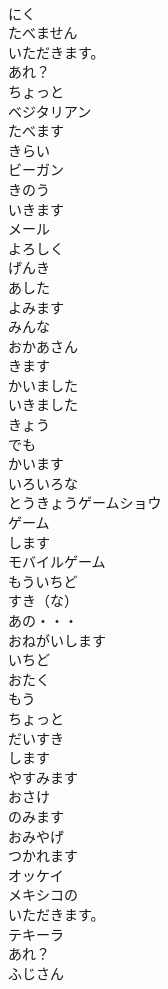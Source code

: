 \documentclass[8pt]{extreport}
\begin{document}
\begin{CJK}{UTF8}{min}
\\	にく
\\	たべません
\\	いただきます。
\\	あれ？
\\	ちょっと
\\	ベジタリアン
\\	たべます
\\	きらい
\\	ビーガン
\\	きのう
\\	いきます
\\	メール
\\	よろしく
\\	げんき
\\	あした
\\	よみます
\\	みんな
\\	おかあさん
\\	きます
\\	かいました
\\	いきました
\\	きょう
\\	でも
\\	かいます
\\	いろいろな
\\	とうきょうゲームショウ
\\	ゲーム
\\	します
\\	モバイルゲーム
\\	もういちど
\\	すき（な）
\\	あの・・・
\\	おねがいします
\\	いちど
\\	おたく
\\	もう
\\	ちょっと
\\	だいすき
\\	します
\\	やすみます
\\	おさけ
\\	のみます
\\	おみやげ
\\	つかれます
\\	オッケイ
\\	メキシコの
\\	いただきます。
\\	テキーラ
\\	あれ？
\\	ふじさん

\end{CJK}
\end{document}
